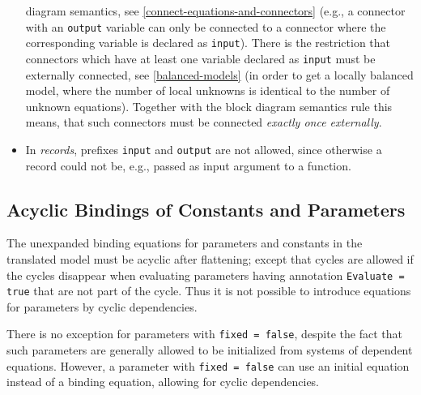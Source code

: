 \begin{itemize}
  diagram semantics, see \cref{connect-equations-and-connectors} (e.g., a connector with an \lstinline!output!
  variable can only be connected to a connector where the corresponding
  variable is declared as \lstinline!input!). There is the restriction that
  connectors which have at least one variable declared as \lstinline!input! must be
  externally connected, see \cref{balanced-models} (in order to get a locally
  balanced model, where the number of local unknowns is identical to the
  number of unknown equations). Together with the block diagram
  semantics rule this means, that such connectors must be connected
  \emph{exactly once externally}.
\item
  In \emph{records}, prefixes \lstinline!input! and \lstinline!output! are not allowed, since
  otherwise a record could not be, e.g., passed as input argument to a
  function.
\end{itemize}

\subsection{Acyclic Bindings of Constants and Parameters}\label{acyclic-bindings-of-constants-and-parameters}

The unexpanded binding equations for parameters and constants in the translated model must be acyclic after flattening; except that cycles are allowed if the cycles disappear when evaluating parameters having annotation \lstinline!Evaluate = true! that are not part of the cycle.
Thus it is not possible to introduce equations for parameters by cyclic dependencies.

\begin{nonnormative}
There is no exception for parameters with \lstinline!fixed = false!, despite the fact that such parameters are generally allowed to be initialized from systems of dependent equations.
However, a parameter with \lstinline!fixed = false! can use an initial equation instead of a binding equation, allowing for cyclic dependencies.
\end{nonnormative}

